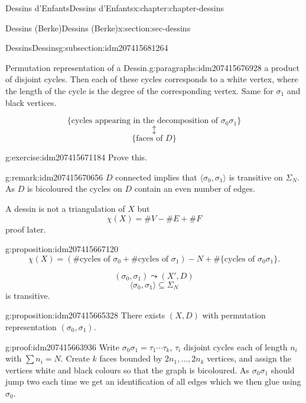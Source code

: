 \documentclass[oneside,10pt,]{book}
\numberwithin{equation}{section}
\begin{document}
\begin{chapterptx}{Dessins d'Enfants}{}{Dessins d'Enfants}{}{}{x:chapter:chapter-dessins}
\begin{sectionptx}{Dessins (Berke)}{}{Dessins (Berke)}{}{}{x:section:sec-dessins}
\begin{subsectionptx}{Dessins}{}{Dessins}{}{}{g:subsection:idm207415681264}
\begin{paragraphs}{Permutation representation of a Dessin.}{g:paragraphs:idm207415676928}
a product of disjoint cycles. Then each of these cycles corresponds to a  white vertex, where the length of the cycle is the degree of the corresponding vertex. Same for \(\sigma_1\) and black vertices.%
\par
%
\begin{equation*}
\{\text{cycles appearing in the decomposition of }\sigma_0\sigma_1\}
\end{equation*}
%
\begin{equation*}
\updownarrow
\end{equation*}
%
\begin{equation*}
\{\text{faces of }D\}
\end{equation*}
%
\begin{inlineexercise}{}{g:exercise:idm207415671184}%
Prove this.%
\end{inlineexercise}
\begin{remark}{}{g:remark:idm207415670656}%
\(D\) connected implies that \(\langle \sigma_0, \sigma_1 \rangle\) is transitive on \(\Sigma_N\). As \(D\) is bicoloured the cycles on \(D\) contain an even number of edges.%
\end{remark}
A dessin is not a triangulation of \(X\) but%
\begin{equation*}
\chi (X) = \#V -  \#E  + \#F
\end{equation*}
proof later.%
\begin{proposition}{}{}{g:proposition:idm207415667120}%
%
\begin{equation*}
\chi(X) = (\#\text{cycles of }\sigma_0+\#\text{cycles of }\sigma_1) - N + \#\{\text{cycles of }\sigma_0\sigma_1\}\text{.}
\end{equation*}
%
\end{proposition}
%
\begin{equation*}
(\sigma_0, \sigma_1) \leadsto (X',D)
\end{equation*}
%
\begin{equation*}
\langle \sigma_0, \sigma_1 \rangle \subseteq \Sigma_N
\end{equation*}
is transitive.%
\begin{proposition}{}{}{g:proposition:idm207415665328}%
There exists \((X,D)\) with permutation representation \((\sigma_0, \sigma_1)\).%
\end{proposition}
\begin{proofptx}{}{g:proof:idm207415663936}
Write \(\sigma_0\sigma_1 = \tau_1 \cdots \tau_k\), \(\tau_i\) disjoint cycles each of length \(n_i\) with \(\sum n_i = N\). Create \(k\) faces bounded by \(2n_1, \ldots, 2n_k\) vertices, and assign the vertices white and black colours so that the graph is bicoloured. As \(\sigma_0\sigma_1\) should jump two each time we get an identification of all edges which we then  glue using \(\sigma_0\).%

\end{proofptx}
\end{paragraphs}
\end{subsectionptx}
\end{sectionptx}
\end{chapterptx}
\end{document}
